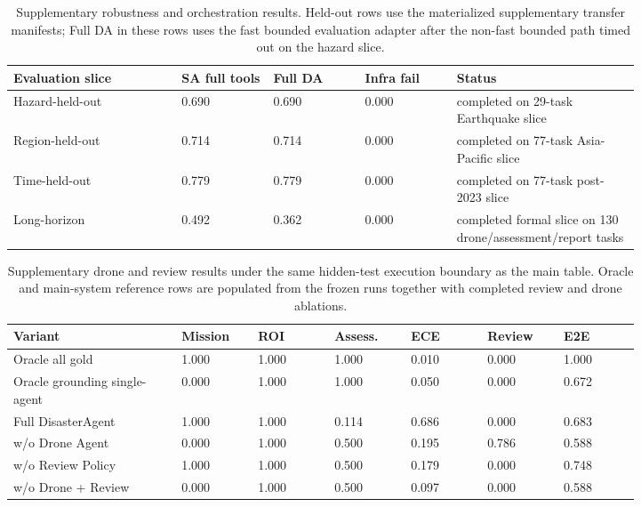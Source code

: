 \documentclass{article}
\begin{document}
\begin{table}[ht]
    \centering
    \small
    \setlength{\tabcolsep}{4pt}
    \caption{Supplementary robustness and orchestration results. Held-out rows use the materialized supplementary transfer manifests; Full DA in these rows uses the fast bounded evaluation adapter after the non-fast bounded path timed out on the hazard slice.}
    \label{tab:orchestration-comparison}
    \begin{tabular}{L{0.22\linewidth}C{0.12\linewidth}C{0.12\linewidth}C{0.12\linewidth}L{0.24\linewidth}}
        \toprule
        Evaluation slice & SA full tools & Full DA & Infra fail & Status \\
        \midrule
        Hazard-held-out & 0.690 & 0.690 & 0.000 & completed on 29-task Earthquake slice \\
        Region-held-out & 0.714 & 0.714 & 0.000 & completed on 77-task Asia-Pacific slice \\
        Time-held-out & 0.779 & 0.779 & 0.000 & completed on 77-task post-2023 slice \\
        Long-horizon & 0.492 & 0.362 & 0.000 & completed formal slice on 130 drone/assessment/report tasks \\
        \bottomrule
    \end{tabular}
\end{table}

\begin{table}[ht]
    \centering
    \small
    \setlength{\tabcolsep}{4pt}
    \caption{Supplementary drone and review results under the same hidden-test execution boundary as the main table. Oracle and main-system reference rows are populated from the frozen runs together with completed review and drone ablations.}
    \label{tab:drone-review}
    \begin{tabular}{L{0.22\linewidth}C{0.10\linewidth}C{0.10\linewidth}C{0.10\linewidth}C{0.10\linewidth}C{0.10\linewidth}C{0.10\linewidth}}
        \toprule
        Variant & Mission & ROI & Assess. & ECE & Review & E2E \\
        \midrule
        Oracle all gold & 1.000 & 1.000 & 1.000 & 0.010 & 0.000 & 1.000 \\
        Oracle grounding single-agent & 0.000 & 1.000 & 1.000 & 0.050 & 0.000 & 0.672 \\
        Full DisasterAgent & 1.000 & 1.000 & 0.114 & 0.686 & 0.000 & 0.683 \\
        w/o Drone Agent & 0.000 & 1.000 & 0.500 & 0.195 & 0.786 & 0.588 \\
        w/o Review Policy & 1.000 & 1.000 & 0.500 & 0.179 & 0.000 & 0.748 \\
        w/o Drone + Review & 0.000 & 1.000 & 0.500 & 0.097 & 0.000 & 0.588 \\
        \bottomrule
    \end{tabular}
\end{table}
\end{document}

